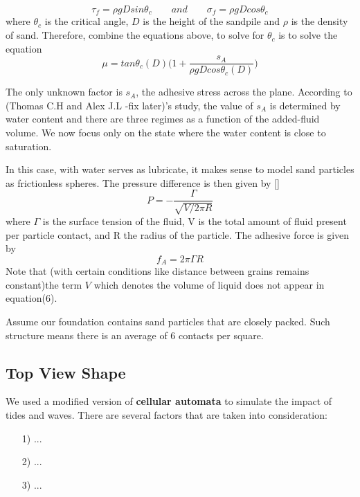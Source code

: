 \documentclass[12pt]{article}
\begin{document}
$$\tau_f = \rho gDsin\theta_c \qquad and \qquad \sigma_f = \rho gDcos\theta_c$$
where $\theta_c$ is the critical angle, $D$ is the height of the sandpile and $\rho$ is the density of sand. Therefore, combine the equations above, to solve for $\theta_c$ is to solve the equation
$$\mu = tan\theta_c(D)\bigg(1 + \frac{s_A}{\rho gDcos\theta_c(D)}\bigg)$$
\par
The only unknown factor is $s_A$, the adhesive stress across the plane. According to (Thomas C.H and Alex J.L -fix later)'s study, the value of $s_A$ is determined by water content and there are three regimes as a function of the added-fluid volume. We now focus only on the state where the water content is close to saturation. 
\par
In this case, with water serves as lubricate, it makes sense to model sand particles as frictionless spheres. The pressure difference is then given by [] 
$$P = -\frac{\Gamma}{\sqrt{V/2\pi R}}$$
where $\Gamma$ is the surface tension of the fluid, V is the total amount of fluid present per particle contact, and R the radius of the particle. The adhesive force is given by
$$f_A = 2\pi \Gamma R$$
Note that (with certain conditions like distance between grains remains constant)the term $V$ which denotes the volume of liquid does not appear in equation(6).
\par
Assume our foundation contains sand particles that are closely packed. Such structure means there is an average of 6 contacts per square.

\subsection{Top View Shape}
\par 
We used a modified version of\textbf{ cellular automata} to simulate the impact of tides and waves. There are several factors that are taken into consideration:
\par 
\begin{itemize}
	\item [1)] 
	...     
	\item [2)]
	...
	\item [3)]
	...
\end{itemize}
\end{document}

